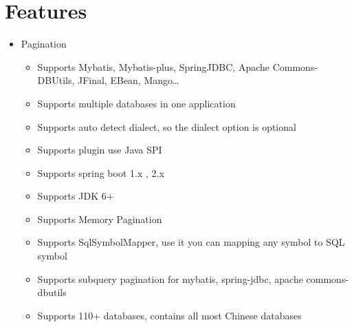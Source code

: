 \documentclass[
]{book}
\providecommand{\tightlist}{%
  \setlength{\itemsep}{0pt}\setlength{\parskip}{0pt}}
\begin{document}
\hypertarget{features}{%
\section{Features}\label{features}}

\begin{itemize}
\tightlist
\item
  Pagination

  \begin{itemize}
  \tightlist
  \item
    Supports Mybatis, Mybatis-plus, SpringJDBC, Apache Commons-DBUtils, JFinal, EBean, Mango\ldots{}
  \item
    Supports multiple databases in one application
  \item
    Supports auto detect dialect, so the dialect option is optional
  \item
    Supports plugin use Java SPI
  \item
    Supports spring boot 1.x , 2.x
  \item
    Supports JDK 6+
  \item
    Supports Memory Pagination
  \item
    Supports SqlSymbolMapper, use it you can mapping any symbol to SQL symbol
  \item
    Supports subquery pagination for mybatis, spring-jdbc, apache commons-dbutils
  \item
    Supports 110+ databases, contains all most Chinese databases


\end{itemize}
\end{itemize}
\end{document}
